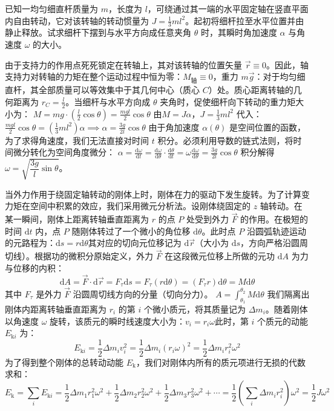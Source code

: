\documentclass[lang=cn,11pt]{elegantbook}
\begin{document}
\begin{exercise}
已知一均匀细直杆质量为 $m$，长度为 $l$，可绕通过其一端的水平固定轴在竖直平面内自由转动，它对该转轴的转动惯量为 $J = \frac{1}{3}ml^2$。起初将细杆拉至水平位置并由静止释放。试求细杆下摆到与水平方向成任意夹角 $\theta$ 时，其瞬时角加速度 $\alpha$ 与角速度 $\omega$ 的大小。
\end{exercise}
\begin{solution}
由于支持力的作用点死死锁定在转轴上，其对该转轴的位置矢量 $\vec{r} \equiv 0$。因此，轴支持力对转轴的力矩在整个运动过程中恒为零：$M_{\text{轴}} \equiv 0$，重力 $m\vec{g}$：对于均匀细直杆，其全部质量可以等效集中于其几何中心（质心 $C$）处。质心距离转轴的几何距离为 $r_C = \frac{l}{2}$。当细杆与水平方向成 $\theta$ 夹角时，促使细杆向下转动的重力矩大小为： \(M = mg \cdot \left(\frac{l}{2}\cos\theta\right) = \frac{mgl}{2}\cos\theta\) 由$M = J\alpha$，$J = \frac{1}{3}ml^2$ 代入： \(\frac{mgl}{2}\cos\theta = \left(\frac{1}{3}ml^2\right) \alpha\implies \alpha = \frac{3g}{2l}\cos\theta\) 由于角加速度 $\alpha(\theta)$ 是空间位置的函数，为了求得角速度，我们无法直接对时间 $t$ 积分。必须利用导数的链式法则，将时间微分转化为空间角度微分： \(\alpha = \frac{\mathrm{d}\omega}{\mathrm{d}t} = \frac{\mathrm{d}\omega}{\mathrm{d}\theta} \cdot \frac{\mathrm{d}\theta}{\mathrm{d}t} = \omega\frac{\mathrm{d}\omega}{\mathrm{d}\theta}= \frac{3g}{2l}\cos\theta\) 积分解得$\omega = \sqrt{\dfrac{3g}{l}\sin\theta}$。
\end{solution}

\begin{definition}[力矩做功与元功表达式]
当外力作用于绕固定轴转动的刚体上时，刚体在力的驱动下发生旋转。为了计算变力矩在空间中积累的效应，我们采用微元分析法。设刚体绕固定的 $z$ 轴转动。在某一瞬间，刚体上距离转轴垂直距离为 $r$ 的点 $P$ 处受到外力 $\vec{F}$ 的作用。在极短的时间 $\mathrm{d}t$ 内，点 $P$ 随刚体转过了一个微小的角位移 $\mathrm{d}\theta$。此时点 $P$ 沿圆弧轨迹运动的元路程为：$\mathrm{d}s = r\mathrm{d}\theta$其对应的切向元位移记为 $\mathrm{d}\vec{r}$（大小为 $\mathrm{d}s$，方向严格沿圆周切线）。根据功的微积分原始定义，外力 $\vec{F}$ 在这段微元位移上所做的元功 $\mathrm{d}A$ 为力与位移的内积：$$\mathrm{d}A = \vec{F} \cdot \mathrm{d}\vec{r} = F_\tau \mathrm{d}s=F_\tau (r\mathrm{d}\theta) = (F_\tau r)\mathrm{d}\theta=M\mathrm{d}\theta$$其中 $F_\tau$ 是外力 $\vec{F}$ 沿圆周切线方向的分量（切向分力）。
 \(\boxed{A = \int_{\theta_1}^{\theta_2} M\mathrm{d}\theta}\) 
我们隔离出刚体内距离转轴垂直距离为 $r_i$ 的第 $i$ 个微小质元，将其质量记为 $\Delta m_i$。随着刚体以角速度 $\omega$ 旋转，该质元的瞬时线速度大小为：$v_i = r_i \omega$此时，第 $i$ 个质元的动能 $E_{\text{k}i}$ 为：$$E_{\text{k}i} = \frac{1}{2}\Delta m_i v_i^2 = \frac{1}{2}\Delta m_i (r_i \omega)^2 = \frac{1}{2}\Delta m_i r_i^2 \omega^2$$为了得到整个刚体的总转动动能 $E_{\text{k}}$，我们对刚体内所有的质元项进行无损的代数求和：$$E_{\text{k}} = \sum_i E_{\text{k}i} =\frac{1}{2}\Delta m_1 r_1^2 \omega^2 + \frac{1}{2}\Delta m_2 r_2^2 \omega^2 + \frac{1}{2}\Delta m_3 r_3^2 \omega^2 + \cdots =\frac{1}{2}\left( \sum_i \Delta m_i r_i^2 \right) \omega^2=\frac{1}{2}J\omega^2$$
\end{definition}
\end{document}

